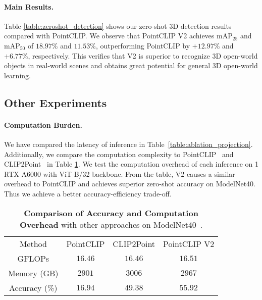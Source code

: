 \documentclass[10pt,twocolumn,letterpaper]{article}
\begin{document}
\vspace{-0.1cm}
\paragraph{Main Results.}
Table \ref{table:zeroshot_detection} shows our zero-shot 3D detection results compared with PointCLIP. We observe that PointCLIP V2 achieves mAP$_{25}$ and mAP$_{50}$ of $18.97\%$ and $11.53\%$, outperforming PointCLIP by $+12.97\%$ and $+6.77\%$, respectively. This verifies that V2 is superior to recognize 3D open-world objects in real-world scenes and obtains great potential for general 3D open-world learning.

\vspace{0.1cm}

\subsection{Other Experiments}

\paragraph{Computation Burden.} We have compared the latency of inference in Table~\ref{table:ablation_projection}. Additionally, we compare the computation complexity to PointCLIP~\cite{zhang2022pointclip} and CLIP2Point~\cite{Huang2022CLIP} in Table \ref{tab:computation_burden}. We test the computation overhead of each inference on 1 RTX A6000 with ViT-B/32 backbone. From the table, V2 causes a similar overhead to PointCLIP and achieves superior zero-shot accuracy on ModelNet40. Thus we achieve a better accuracy-efficiency trade-off.


\begin{table}[t!]
\centering
\begin{adjustbox}{width=0.93\linewidth}
	\begin{tabular}{c c c c }
	\toprule
	\multirow{1}{*}{Method} &\multicolumn{1}{c}{PointCLIP} &\multicolumn{1}{c}{CLIP2Point} &\multicolumn{1}{c}{PointCLIP V2}\\
	\cmidrule(lr){1-1} \cmidrule(lr){2-2} \cmidrule(lr){3-3} \cmidrule(lr){4-4}
	GFLOPs & $16.46$ & $16.46$ & $16.51$\\
        Memory (GB) & $2901$ & $3006$ & $2967$\\
        Accuracy (\%) & $16.94$ & $49.38$ & $55.92$\\
	\bottomrule
	\end{tabular}
\end{adjustbox}
\vspace{0.3cm}
\caption{\textbf{Comparison of Accuracy and Computation Overhead} with other approaches on ModelNet40~\cite{wu20153d}. }
\label{tab:computation_burden}
\end{table}
\end{document}

